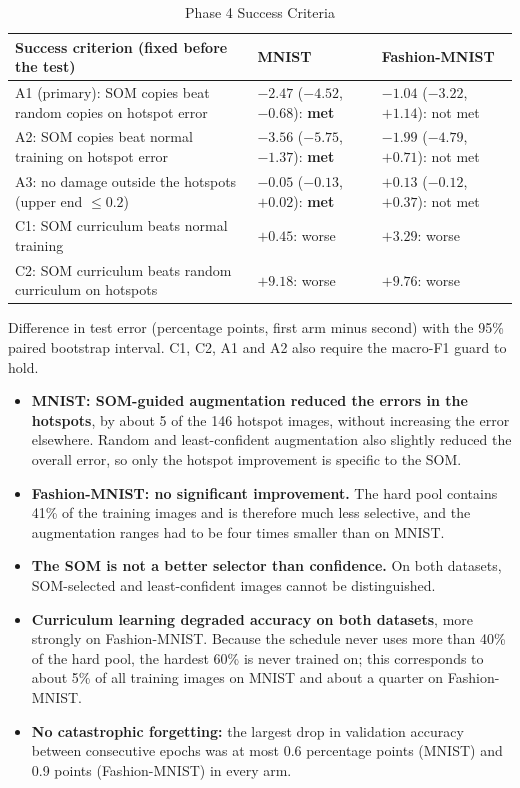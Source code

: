 \documentclass{scrartcl}
\begin{document}
\begin{table}[H]
\centering
\caption{Phase 4 Success Criteria}
\label{tab:criteria}
\renewcommand{\arraystretch}{1.12}
\footnotesize
\begin{tabular}{|L{0.40\textwidth}|C{0.24\textwidth}|C{0.24\textwidth}|}
\hline
\textbf{Success criterion (fixed before the test)} & \textbf{MNIST} & \textbf{Fashion-MNIST} \\ \hline
A1 (primary): SOM copies beat random copies on hotspot error & $-2.47$ ($-4.52$, $-0.68$): \textbf{met} & $-1.04$ ($-3.22$, $+1.14$): not met \\ \hline
A2: SOM copies beat normal training on hotspot error & $-3.56$ ($-5.75$, $-1.37$): \textbf{met} & $-1.99$ ($-4.79$, $+0.71$): not met \\ \hline
A3: no damage outside the hotspots (upper end $\le 0.2$) & $-0.05$ ($-0.13$, $+0.02$): \textbf{met} & $+0.13$ ($-0.12$, $+0.37$): not met \\ \hline
C1: SOM curriculum beats normal training & $+0.45$: worse & $+3.29$: worse \\ \hline
C2: SOM curriculum beats random curriculum on hotspots & $+9.18$: worse & $+9.76$: worse \\ \hline
\end{tabular}

\par\vspace{3pt}
{\footnotesize\raggedright\noindent Difference in test error (percentage points, first arm minus second) with the 95\% paired bootstrap interval. C1, C2, A1 and A2 also require the macro-F1 guard to hold.\par}
\end{table}

\begin{itemize}
  \item \textbf{MNIST: SOM-guided augmentation reduced the errors in the hotspots}, by about 5 of the 146 hotspot images, without increasing the error elsewhere. Random and least-confident augmentation also slightly reduced the overall error, so only the hotspot improvement is specific to the SOM.
  \item \textbf{Fashion-MNIST: no significant improvement.} The hard pool contains 41\% of the training images and is therefore much less selective, and the augmentation ranges had to be four times smaller than on MNIST.
  \item \textbf{The SOM is not a better selector than confidence.} On both datasets, SOM-selected and least-confident images cannot be distinguished.
  \item \textbf{Curriculum learning degraded accuracy on both datasets}, more strongly on Fashion-MNIST. Because the schedule never uses more than 40\% of the hard pool, the hardest 60\% is never trained on; this corresponds to about 5\% of all training images on MNIST and about a quarter on Fashion-MNIST.
  \item \textbf{No catastrophic forgetting:} the largest drop in validation accuracy between consecutive epochs was at most 0.6 percentage points (MNIST) and 0.9 points (Fashion-MNIST) in every arm.
\end{itemize}
\end{document}

